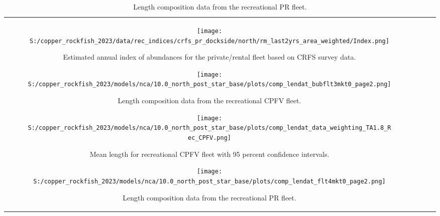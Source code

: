 \documentclass[11pt,
  letterpaper,
]{article}
\begin{document}
\begin{longtable}[t]{c>{\centering\arraybackslash}p{2cm}>{\centering\arraybackslash}p{2cm}>{\centering\arraybackslash}p{2cm}}
\begin{figure}
{\centering
\texttt{[image: S:/copper\_rockfish\_2023/data/rec\_indices/crfs\_pr\_dockside/north/rm\_last2yrs\_area\_weighted/Index.png]}
}
\caption{Estimated annual index of abundances for the private/rental fleet based on CRFS survey data.\label{fig:crfs-pr-index-main}}
\end{figure}

\pagebreak

\begin{figure}
{\centering
\texttt{[image: S:/copper\_rockfish\_2023/models/nca/10.0\_north\_post\_star\_base/plots/comp\_lendat\_bubflt3mkt0\_page2.png]}
}
\caption{Length composition data from the recreational CPFV fleet.\label{fig:rec-cpfv-len-data}}
\end{figure}

\pagebreak

\begin{figure}
{\centering
\texttt{[image: S:/copper\_rockfish\_2023/models/nca/10.0\_north\_post\_star\_base/plots/comp\_lendat\_data\_weighting\_TA1.8\_Rec\_CPFV.png]}
}
\caption{Mean length for recreational CPFV fleet with 95 percent confidence intervals.\label{fig:mean-rec-cpfv-len-data}}
\end{figure}

\pagebreak

\begin{figure}
{\centering
\texttt{[image: S:/copper\_rockfish\_2023/models/nca/10.0\_north\_post\_star\_base/plots/comp\_lendat\_flt4mkt0\_page2.png]}
}
\caption{Length composition data from the recreational PR fleet.\label{fig:rec-pr-len-data}}
\end{figure}

\pagebreak


\end{longtable}
\end{document}
